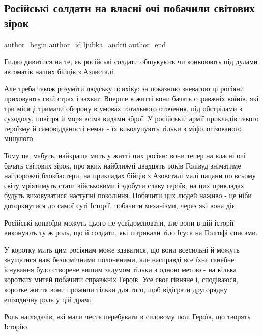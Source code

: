  
 
 
 
 
 
\subsection{Російські солдати на власні очі побачили світових зірок}
\label{sec:17_05_2022.fb.ljubka_andrii.1.zirky_geroi_rosiane}
 
\ifcmt
 author_begin
   author_id ljubka_andrii
 author_end
\fi

Гидко дивитися на те, як російські солдати обшукують чи конвоюють під дулами
автоматів наших бійців з Азовсталі. 

Але треба також розуміти людську психіку: за показною зневагою ці росіяни
приховують свій страх і захват. Вперше в житті вони бачать справжніх воїнів,
які три місяці тримали оборону в умовах тотального оточення, під обстрілами з
суходолу, повітря й моря всіма видами зброї. У російській армії прикладів
такого героїзму й самовідданості немає - їх виколупують тільки з
міфологізованого минулого. 

Тому це, мабуть, найкраща мить у житті цих росіян: вони тепер на власні очі
бачать світових зірок, про яких найближчі двадцять років Голівуд зніматиме
найдорожчі блокбастери, на прикладах бійців з Азовсталі малі пацани по всьому
світу мріятимуть стати військовими і здобути славу героїв, на цих прикладах
будуть виховуватися наступні покоління. Побачити цих людей наживо - це ніби
доторкнутися до самої суті Історії, побачити механізми, через які вона діє. 

Російські конвоїри можуть цього не усвідомлювати, але вони в цій історії
виконують ту ж роль, що й солдати, які штрикали тіло Ісуса на Голгофі списами. 

У коротку мить цим росіянам може здаватися, що вони всесильні й можуть
знущатися наж безпомічними полоненими, але насправді все їхнє ганебне існування
було створене вищим задумом тільки з одною метою - на кілька коротких митей
побачити справжніх Героїв. Усе своє гівняне і, сподіваюся, коротке життя вони
прожили тільки для того, щоб відіграти другорядну епізодичну роль у цій драмі. 

Роль наглядачів, які мали честь перебувати в силовому полі Героїв, що творять
Історію.

